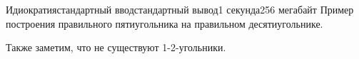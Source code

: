 \begin{problem}{Идиократия}{стандартный ввод}{стандартный вывод}{1 секунда}{256 мегабайт}
Пример построения правильного пятиугольника на правильном десятиугольнике.

Также заметим, что не существуют 1-2-угольники.

\end{problem}


